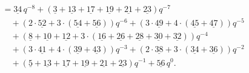 \begin{align*}
	&=\underline{34}\,q^{-8}+(\underline{3}+\underline{13}+\underline{17}+\underline{19}+\underline{21}+\underline{23})q^{-7}\\
	&\quad+(2\cdot\underline{52}+3\cdot(\underline{54}+\underline{56}))q^{-6}+(3\cdot\underline{49}+4\cdot(\underline{45}+\underline{47}))q^{-5}\\
	&\quad+(\underline{8}+\underline{10}+\underline{12}+3\cdot(\underline{16}+\underline{26}+\underline{28}+\underline{30}+\underline{32}))q^{-4}\\
	&\quad+(3\cdot\underline{41}+4\cdot(\underline{39}+\underline{43}))q^{-3}+(2\cdot\underline{38}+3\cdot(\underline{34}+\underline{36}))q^{-2}\\
	&\quad+(\underline{5}+\underline{13}+\underline{17}+\underline{19}+\underline{21}+\underline{23})q^{-1}+\underline{56}\,q^0.
\end{align*}

